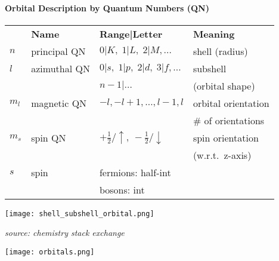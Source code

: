 \paragraph{Orbital Description by Quantum Numbers (QN)}
\renewcommand{\arraystretch}{1.1}
\setlength{\oldtabcolsep}{\tabcolsep}\setlength\tabcolsep{2pt}
{\small     %
    \begin{tabularx}{\linewidth}{@{}lllX@{}}
              & \textbf{Name} & \textbf{Range|Letter}                             & \textbf{Meaning}    \\
        $n$   & principal QN  & $0|K,\;1|L,\;2|M,\dots$                           & shell (radius)      \\
        $l$   & azimuthal QN  & $0|s,\;1|p,\;2|d,\;3|f,\dots$                     & subshell            \\
              &               & $n-1|\dots$                                       & (orbital shape)     \\
        $m_l$ & magnetic QN   & $-l,-l+1,\dots,l-1,l$                             & orbital orientation \\
              &               &                                                   & \# of orientations  \\
        $m_s$ & spin QN       & $+\frac{1}{2}/\uparrow,\:-\frac{1}{2}/\downarrow$ & spin orientation    \\
              &               &                                                   & (w.r.t.\ z-axis)    \\
        $s$   & spin          & fermions: half-int                                &                     \\
              &               & bosons: int                                       &
    \end{tabularx}
}           %
\renewcommand{\arraystretch}{1}
\setlength{\tabcolsep}{\oldtabcolsep}


\begin{center}
    \texttt{[image: shell\_subshell\_orbital.png]}
\end{center}
\textit{source: chemistry stack exchange}
\begin{center}
    \texttt{[image: orbitals.png]}
\end{center}


